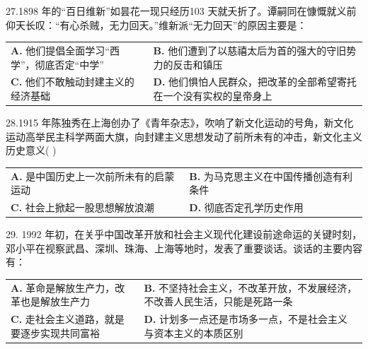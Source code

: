 \documentclass[UTF8,11pt]{ctexart}
\begin{document}
27.1898 年的“百日维新”如昙花一现只经历103 天就夭折了。谭嗣同在慷慨就义前仰天长叹：“有心杀贼，无力回天。”维新派“无力回天”的原因主要是：


\begin{center}\begin{tabular}{>{\raggedright\arraybackslash}p{\dimexpr(\linewidth-4\tabcolsep)/2\relax}>{\raggedright\arraybackslash}p{\dimexpr(\linewidth-4\tabcolsep)/2\relax}}
\textbf{A.} 他们提倡全面学习“西学”，彻底否定“中学” & \textbf{B.} 他们遭到了以慈禧太后为首的强大的守旧势力的反击和镇压\\[.35em]
\textbf{C.} 他们不敢触动封建主义的经济基础 & \textbf{D.} 他们惧怕人民群众，把改革的全部希望寄托在一个没有实权的皇帝身上\\[.35em]\end{tabular}\end{center}

28.1915 年陈独秀在上海创办了《青年杂志》，吹响了新文化运动的号角，新文化运动高举民主科学两面大旗，向封建主义思想发动了前所未有的冲击，新文化主义历史意义( )


\begin{center}\begin{tabular}{>{\raggedright\arraybackslash}p{\dimexpr(\linewidth-4\tabcolsep)/2\relax}>{\raggedright\arraybackslash}p{\dimexpr(\linewidth-4\tabcolsep)/2\relax}}
\textbf{A.} 是中国历史上一次前所未有的启蒙运动 & \textbf{B.} 为马克思主义在中国传播创造有利条件\\[.35em]
\textbf{C.} 社会上掀起一股思想解放浪潮 & \textbf{D.} 彻底否定孔学历史作用\\[.35em]\end{tabular}\end{center}

29. 1992 年初，在关乎中国改革开放和社会主义现代化建设前途命运的关键时刻，邓小平在视察武昌、深圳、珠海、上海等地时，发表了重要谈话。谈话的主要内容有：


\begin{center}\begin{tabular}{>{\raggedright\arraybackslash}p{\dimexpr(\linewidth-4\tabcolsep)/2\relax}>{\raggedright\arraybackslash}p{\dimexpr(\linewidth-4\tabcolsep)/2\relax}}
\textbf{A.} 革命是解放生产力，改革也是解放生产力 & \textbf{B.} 不坚持社会主义，不改革开放，不发展经济，不改善人民生活，只能是死路一条\\[.35em]
\textbf{C.} 走社会主义道路，就是要逐步实现共同富裕 & \textbf{D.} 计划多一点还是市场多一点，不是社会主义与资本主义的本质区别\\[.35em]\end{tabular}\end{center}
\end{document}
